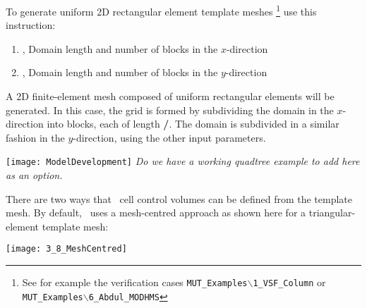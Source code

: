 To generate uniform 2D rectangular element template meshes \footnote{See for example the verification cases \texttt{MUT\_Examples$\backslash$1\_VSF\_Column} or \texttt{MUT\_Examples$\backslash$6\_Abdul\_MODHMS}} use this instruction:

    {
    \squish
    \begin{enumerate}
    \item {},   Domain length and number of blocks in the $x$-direction
    \item {},   Domain length and number of blocks in the $y$-direction
    \end{enumerate}
    A 2D finite-element mesh composed of uniform rectangular elements will be generated. In this case, the
    grid is formed by subdividing the domain in the $x$-direction into  blocks, each of length
    \textbf{/}. The domain is subdivided in a similar fashion in the $y$-direction, using the other input parameters.
    }

\texttt{[image: ModelDevelopment]} \textit{Do we have a working quadtree example to add here as an option.}
%
%

There are two ways that \mf\ cell control volumes can be defined from the template mesh.  By default, \mut\ uses a mesh-centred approach as shown here for a triangular-element template mesh:

    \texttt{[image: 3\_8\_MeshCentred]}

